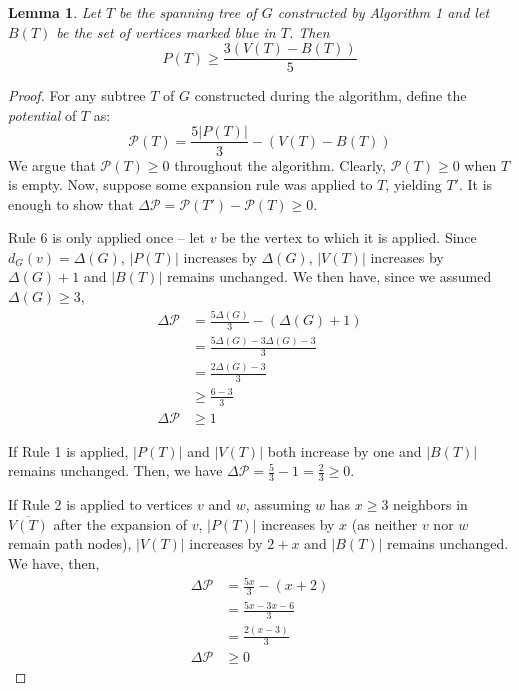 \documentclass[12pt]{article}
\newtheorem{lemma}[theorem]{Lemma}
\begin{document}
\begin{lemma}
  Let $T$ be the spanning tree of $G$ constructed by Algorithm 1 and let $B(T)$ be the set of vertices marked blue in $T$.
  Then
  $$ P(T) \ge \frac{3(V(T) - B(T))}{5} $$
\end{lemma}
\begin{proof}
  For any subtree $T$ of $G$ constructed during the algorithm, define the \emph{potential} of $T$ as:
  $$ \mathcal{P}(T) = \frac{5|P(T)|}{3} - (V(T) - B(T)) $$
  We argue that $\mathcal{P}(T) \ge 0$ throughout the algorithm.
  Clearly, $\mathcal{P}(T) \ge 0$ when $T$ is empty.
  Now, suppose some expansion rule was applied to $T$, yielding $T'$.
  It is enough to show that $\Delta \mathcal{P} = \mathcal{P}(T') - \mathcal{P}(T) \ge 0$.

  Rule 6 is only applied once -- let $v$ be the vertex to which it is applied.
  Since $d_G(v) = \Delta(G)$, $|P(T)|$ increases by $\Delta(G)$, $|V(T)|$ increases by $\Delta(G) + 1$ and $|B(T)|$ remains unchanged.
  We then have, since we assumed $\Delta(G) \ge 3$,
  \begin{align*}
    \Delta \mathcal{P} &= \frac{5\Delta(G)}{3} - (\Delta(G) + 1) \\
                       &= \frac{5\Delta(G) - 3\Delta(G) - 3}{3} \\
                       &= \frac{2\Delta(G) - 3}{3} \\
                       &\ge \frac{6 - 3}{3} \\
    \Delta \mathcal{P} &\ge 1
  \end{align*}

  If Rule 1 is applied, $|P(T)|$ and $|V(T)|$ both increase by one and $|B(T)|$ remains unchanged.
  Then, we have $\Delta \mathcal{P} = \frac{5}{3} - 1 = \frac{2}{3} \ge 0$.

  If Rule 2 is applied to vertices $v$ and $w$, assuming $w$ has $x \ge 3$ neighbors in $\overline{V(T)}$ after the expansion of $v$, $|P(T)|$ increases by $x$ (as neither $v$ nor $w$ remain path nodes), $|V(T)|$ increases by $2 + x$ and $|B(T)|$ remains unchanged.
  We have, then,
  \begin{align*}
    \Delta \mathcal{P} &= \frac{5x}{3} - (x + 2) \\
                       &= \frac{5x - 3x - 6}{3}\\
                       &= \frac{2(x - 3)}{3} \\
    \Delta \mathcal{P} &\ge 0
  \end{align*}


\end{proof}
\end{document}
